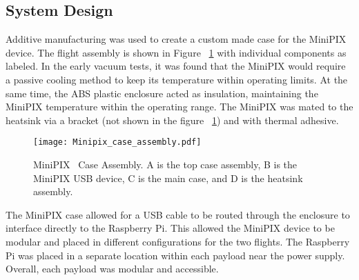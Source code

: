 \subsection{System Design}
Additive manufacturing was used to create a custom made case for the MiniPIX device.  The flight assembly is shown in Figure ~\ref{fig:minipix_case} with individual components as labeled.  In the early vacuum tests, it was found that the MiniPIX would require a passive cooling method to keep its temperature within operating limits.  At the same time, the ABS plastic enclosure acted as insulation, maintaining the MiniPIX temperature within the operating range.  The MiniPIX was mated to the heatsink via a bracket (not shown in the figure ~\ref{fig:minipix_case}) and with thermal adhesive.
\begin{figure}[H]
    \centering
    \texttt{[image: Minipix\_case\_assembly.pdf]} %
    \caption{MiniPIX~\cite{advacam} Case Assembly. A is the top case assembly, B is the MiniPIX USB device, C is the main case, and D is the heatsink assembly.}
    \label{fig:minipix_case}
\end{figure}
The MiniPIX case allowed for a USB cable to be routed through the enclosure to interface directly to the Raspberry Pi.  This allowed the MiniPIX device to be modular and placed in different configurations for the two flights.  The Raspberry Pi was placed in a separate location within each payload near the power supply.  Overall, each payload was modular and accessible.



